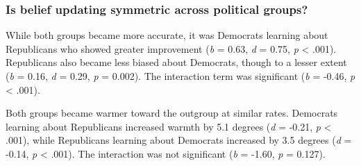 \documentclass[
  11pt,
  oneside]{article}
\begin{document}
\subsubsection{Is belief updating symmetric across political
groups?}\label{is-belief-updating-symmetric-across-political-groups}

While both groups became more accurate, it was Democrats learning about
Republicans who showed greater improvement (\emph{b} = 0.63, \emph{d} =
0.75, \emph{p} \textless{} .001). Republicans also became less biased
about Democrats, though to a lesser extent (\emph{b} = 0.16, \emph{d} =
0.29, \emph{p} = 0.002). The interaction term was significant (\emph{b}
= -0.46, \emph{p} \textless{} .001).

Both groups became warmer toward the outgroup at similar rates.
Democrats learning about Republicans increased warmth by 5.1 degrees
(\emph{d} = -0.21, \emph{p} \textless{} .001), while Republicans
learning about Democrats increased by 3.5 degrees (\emph{d} = -0.14,
\emph{p} \textless{} .001). The interaction was not significant
(\emph{b} = -1.60, \emph{p} = 0.127).
\end{document}
